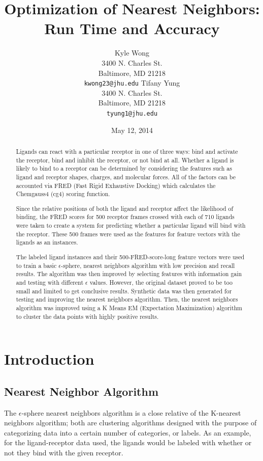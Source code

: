 \documentclass[11pt,letterpaper]{article}
\title{Optimization of Nearest Neighbors: Run Time and Accuracy}
\author{Kyle Wong \\
  3400 N. Charles St. \\
  Baltimore, MD 21218 \\
  {\tt kwong23@jhu.edu}
  \And
  Tifany Yung \\
  3400 N. Charles St. \\
  Baltimore, MD 21218 \\
  {\tt tyung1@jhu.edu}}
\date{May 12, 2014}
\begin{document}
\maketitle
\begin{abstract}
Ligands can react with a particular receptor in one of three ways: bind and activate the receptor, bind and inhibit the receptor, or not bind at all. Whether a ligand is likely to bind to a receptor can be determined by considering the features such as ligand and receptor shapes, charges, and molecular forces. All of the factors can be accounted via FRED (Fast Rigid Exhaustive Docking) which calculates the Chemgauss4 (cg4) scoring function.

Since the relative positions of both the ligand and receptor affect the likelihood of binding, the FRED scores for 500 receptor frames crossed with each of 710 ligands were taken to create a system for predicting whether a particular ligand will bind with the receptor. These 500 frames were used as the features for feature vectors with the ligands as an instances.

The labeled ligand instances and their 500-FRED-score-long feature vectors were used to train a basic $\epsilon$-sphere, nearest neighbors algorithm with low precision and recall results. The algorithm was then improved by selecting features with information gain and testing with different $\epsilon$ values.  However, the original dataset proved to be too small and limited to get conclusive results.  Synthetic data was then generated for testing and improving the nearest neighbors algorithm.  Then, the nearest neighbors algorithm was improved using a K Means EM (Expectation Maximization) algorithm to cluster the data points with highly positive results.  
\end{abstract}

\section{Introduction}
\subsection{Nearest Neighbor Algorithm}

The $\epsilon$-sphere nearest neighbors algorithm is a close relative of the K-nearest neighbors algorithm; both are clustering algorithms designed with the purpose of categorizing data into a certain number of categories, or labels. As an example, for the ligand-receptor data used, the ligands would be labeled with whether or not they bind with the given receptor.
\end{document}
